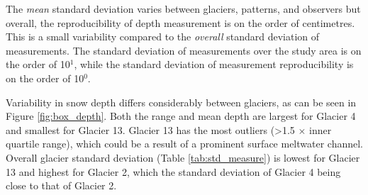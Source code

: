 \documentclass[12pt]{article}
\begin{document}
The \textit{mean} standard deviation varies between glaciers, patterns, and observers but overall, the reproducibility of depth measurement is on the order of centimetres. This is a small variability compared to the \textit{overall} standard deviation of measurements. The standard deviation of measurements over the study area is on the order of 10$^1$, while the standard deviation of measurement reproducibility is on the order of 10$^0$. 

Variability in snow depth differs considerably between glaciers, as can be seen in Figure \ref{fig:box_depth}. Both the range and mean depth are largest for Glacier 4 and smallest for Glacier 13. Glacier 13 has the most outliers (\textgreater 1.5 $\times$ inner quartile range), which could be a result of a prominent surface meltwater channel. Overall glacier standard deviation (Table \ref{tab:std_measure}) is lowest for Glacier 13 and highest for Glacier 2, which the standard deviation of Glacier 4 being close to that of Glacier 2. 
\end{document}

